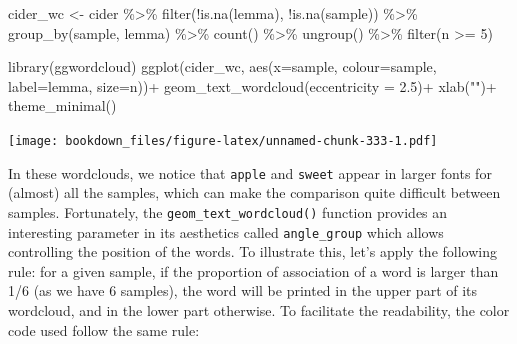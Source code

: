 \documentclass[
]{krantz}
\makeatletter
\newenvironment{Shaded}{\begin{snugshade}}{\end{snugshade}}
\newcommand{\AttributeTok}[1]{\textcolor[rgb]{0.61,0.61,0.61}{#1}}
\newcommand{\DecValTok}[1]{\textcolor[rgb]{0.06,0.06,0.06}{#1}}
\newcommand{\FloatTok}[1]{\textcolor[rgb]{0.06,0.06,0.06}{#1}}
\newcommand{\FunctionTok}[1]{\textcolor[rgb]{0,0,0}{#1}}
\newcommand{\NormalTok}[1]{#1}
\newcommand{\OtherTok}[1]{\textcolor[rgb]{0.37,0.37,0.37}{#1}}
\newcommand{\SpecialCharTok}[1]{\textcolor[rgb]{0,0,0}{#1}}
\newcommand{\StringTok}[1]{\textcolor[rgb]{0.5,0.5,0.5}{#1}}
\newenvironment{kframe}{%
\medskip{}
\setlength{\fboxsep}{.8em}
 \def\at@end@of@kframe{}%
 \ifinner\ifhmode%
  \def\at@end@of@kframe{\end{minipage}}%
  \begin{minipage}{\columnwidth}%
 \fi\fi%
 \def\FrameCommand##1{\hskip\@totalleftmargin \hskip-\fboxsep
 \colorbox{shadecolor}{##1}\hskip-\fboxsep
     \hskip-\linewidth \hskip-\@totalleftmargin \hskip\columnwidth}%
 \MakeFramed {\advance\hsize-\width
   \@totalleftmargin\z@ \linewidth\hsize
   \@setminipage}}%
 {\par\unskip\endMakeFramed%
 \at@end@of@kframe}
\renewenvironment{Shaded}{\begin{kframe}}{\end{kframe}}
\makeatother
\begin{document}
\begin{Shaded}
\begin{Highlighting}[]
\NormalTok{cider\_wc }\OtherTok{\textless{}{-}}\NormalTok{ cider }\SpecialCharTok{\%\textgreater{}\%} 
  \FunctionTok{filter}\NormalTok{(}\SpecialCharTok{!}\FunctionTok{is.na}\NormalTok{(lemma), }\SpecialCharTok{!}\FunctionTok{is.na}\NormalTok{(sample)) }\SpecialCharTok{\%\textgreater{}\%} 
  \FunctionTok{group\_by}\NormalTok{(sample, lemma) }\SpecialCharTok{\%\textgreater{}\%} 
  \FunctionTok{count}\NormalTok{() }\SpecialCharTok{\%\textgreater{}\%} 
  \FunctionTok{ungroup}\NormalTok{() }\SpecialCharTok{\%\textgreater{}\%} 
  \FunctionTok{filter}\NormalTok{(n }\SpecialCharTok{\textgreater{}=} \DecValTok{5}\NormalTok{)}

\FunctionTok{library}\NormalTok{(ggwordcloud)}
\FunctionTok{ggplot}\NormalTok{(cider\_wc, }\FunctionTok{aes}\NormalTok{(}\AttributeTok{x=}\NormalTok{sample, }\AttributeTok{colour=}\NormalTok{sample, }\AttributeTok{label=}\NormalTok{lemma, }\AttributeTok{size=}\NormalTok{n))}\SpecialCharTok{+}
  \FunctionTok{geom\_text\_wordcloud}\NormalTok{(}\AttributeTok{eccentricity =} \FloatTok{2.5}\NormalTok{)}\SpecialCharTok{+}
  \FunctionTok{xlab}\NormalTok{(}\StringTok{""}\NormalTok{)}\SpecialCharTok{+}
  \FunctionTok{theme\_minimal}\NormalTok{()}
\end{Highlighting}
\end{Shaded}

\texttt{[image: bookdown\_files/figure-latex/unnamed-chunk-333-1.pdf]}

In these wordclouds, we notice that \texttt{apple} and \texttt{sweet} appear in larger fonts for (almost) all the samples, which can make the comparison quite difficult between samples. Fortunately, the \texttt{geom\_text\_wordcloud()} function provides an interesting parameter in its aesthetics called \texttt{angle\_group} which allows controlling the position of the words. To illustrate this, let's apply the following rule: for a given sample, if the proportion of association of a word is larger than 1/6 (as we have 6 samples), the word will be printed in the upper part of its wordcloud, and in the lower part otherwise. To facilitate the readability, the color code used follow the same rule:
\end{document}
